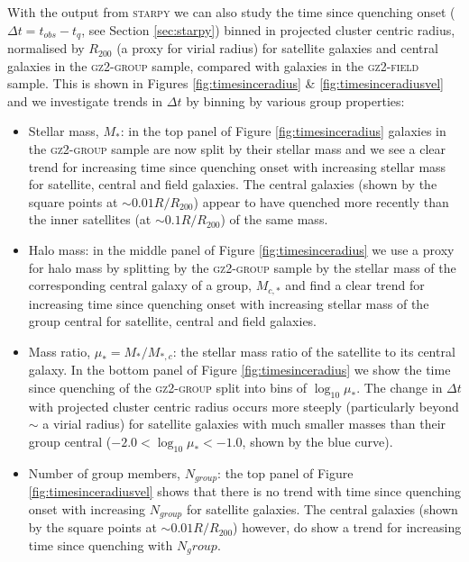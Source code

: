 \documentclass[useAMS,usenatbib]{mn2e}
\def\starpy ~{\textsc{starpy}}
\begin{document}
With the output from \starpy~ we can also study the time since quenching onset ($\Delta t = t_{obs} - t_{q}$, see Section \ref{sec:starpy}) binned in projected cluster centric radius, normalised by $R_{200}$ (a proxy for virial radius) for satellite galaxies and central galaxies in the \textsc{gz2-group} sample, compared with galaxies in the \textsc{gz2-field} sample. This is shown in Figures \ref{fig:timesinceradius} \& \ref{fig:timesinceradiusvel} and we investigate trends in $\Delta t$ by binning by various group properties:
\begin{itemize}

\item{Stellar mass, $M_*$: in the top panel of Figure \ref{fig:timesinceradius} galaxies in the \textsc{gz2-group} sample are now split by their stellar mass and we see a clear trend for increasing time since quenching onset with increasing stellar mass for satellite, central and field galaxies. The central galaxies (shown by the square points at $\sim 0.01 R/R_{200}$) appear to have quenched more recently than the inner satellites (at $\sim0.1R/R_{200}$) 
of the same mass.}

\item{Halo mass: in the middle panel of Figure \ref{fig:timesinceradius} we use a proxy for halo mass by splitting by the \textsc{gz2-group} sample by the stellar mass of the corresponding central galaxy of a group, $M_{c,*}$ and find a clear trend for increasing time since quenching onset with increasing stellar mass of the group central for satellite, central and field galaxies.}

\item{Mass ratio, $\mu_* = M_*/M_{*,c}$: the stellar mass ratio of the satellite to its central galaxy. In the bottom panel of Figure \ref{fig:timesinceradius} we show the time since quenching of the \textsc{gz2-group} split into bins of $\log_{10}\mu_*$. The change in $\Delta t $ with projected cluster centric radius occurs more steeply (particularly beyond $\sim$ a virial radius) for satellite galaxies with much smaller masses than their group central ($-2.0 < \log_{10}\mu_* < -1.0$, shown by the blue curve).}

\item{Number of group members, $N_{group}$: the top panel of Figure \ref{fig:timesinceradiusvel} shows that there is no trend with time since quenching onset with increasing $N_{group}$ for satellite galaxies. The central galaxies (shown by the square points at $\sim 0.01 R/R_{200}$) however, do show a trend for increasing time since quenching with $N_group$.}


\end{itemize}
\end{document}
